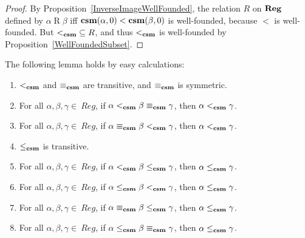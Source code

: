 \begin{proof}
By Proposition~\ref{InverseImageWellFounded}, the relation $R$ on
$\mathbf{Reg}$ defined by $\alpha\mathrel{R}\beta$ iff
$\mathbf{csm}(\alpha, 0)<\mathbf{csm}(\beta, 0)$ is well-founded, because $<$ is
well-founded.  But ${\mathrel{<_{\mathbf{csm}}}}\subseteq R$, and thus $\mathrel{<_{\mathbf{csm}}}$ is well-founded
by Proposition~\ref{WellFoundedSubset}.
\end{proof}

The following lemma holds by easy calculations:

\begin{lemma}
\begin{enumerate}[\quad(1)]
\item $\mathrel{<_{\mathbf{csm}}}$ and $\mathrel{\equiv_{\mathbf{csm}}}$ are transitive, and $\mathrel{\equiv_{\mathbf{csm}}}$ is
  symmetric.

\item For all $\alpha, \beta, \gamma\in\ Reg$, if
  $\alpha\mathrel{<_{\mathbf{csm}}}\beta\mathrel{\equiv_{\mathbf{csm}}}\gamma$, then $\alpha\mathrel{<_{\mathbf{csm}}}\gamma$.

\item For all $\alpha, \beta, \gamma\in\ Reg$, if
  $\alpha\mathrel{\equiv_{\mathbf{csm}}}\beta\mathrel{<_{\mathbf{csm}}}\gamma$, then $\alpha\mathrel{<_{\mathbf{csm}}}\gamma$.

\item $\mathrel{\leq_{\mathbf{csm}}}$ is transitive.

\item For all $\alpha, \beta, \gamma\in\ Reg$, if
  $\alpha\mathrel{<_{\mathbf{csm}}}\beta\mathrel{\leq_{\mathbf{csm}}}\gamma$, then $\alpha\mathrel{\leq_{\mathbf{csm}}}\gamma$.

\item For all $\alpha, \beta, \gamma\in\ Reg$, if
  $\alpha\mathrel{\leq_{\mathbf{csm}}}\beta\mathrel{<_{\mathbf{csm}}}\gamma$, then $\alpha\mathrel{\leq_{\mathbf{csm}}}\gamma$.

\item For all $\alpha, \beta, \gamma\in\ Reg$, if
  $\alpha\mathrel{\equiv_{\mathbf{csm}}}\beta\mathrel{\leq_{\mathbf{csm}}}\gamma$, then $\alpha\mathrel{\leq_{\mathbf{csm}}}\gamma$.

\item For all $\alpha, \beta, \gamma\in\ Reg$, if
  $\alpha\mathrel{\leq_{\mathbf{csm}}}\beta\mathrel{\equiv_{\mathbf{csm}}}\gamma$, then $\alpha\mathrel{\leq_{\mathbf{csm}}}\gamma$.
\end{enumerate}
\end{lemma}

